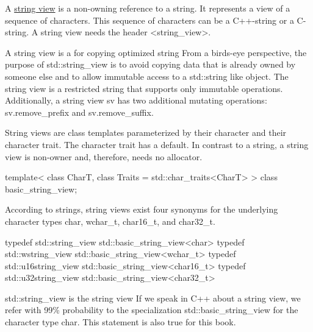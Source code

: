 
A \href{http://en.cppreference.com/w/cpp/string/basic_string_view}{string view} is a non-owning reference to a string. It represents a view of a sequence of characters. This sequence of characters can be a C++-string or a C-string. A string view needs the header <string\_view>.

\begin{myTip}{A string view is a for copying optimized string}
From a birds-eye perspective, the purpose of std::string\_view is to avoid copying data that is already owned by someone else and to allow immutable access to a std::string like object. The string view is a restricted string that supports only immutable operations. Additionally, a string view sv has two additional mutating operations: sv.remove\_prefix and sv.remove\_suffix.
\end{myTip}

String views are class templates parameterized by their character and their character trait. The character trait has a default. In contrast to a string, a string view is non-owner and, therefore, needs no allocator.

\begin{cpp}
template<
	class CharT,
	class Traits = std::char_traits<CharT>
> class basic_string_view;
\end{cpp}

According to strings, string views exist four synonyms for the underlying character types char, wchar\_t, char16\_t, and char32\_t.

\begin{cpp}
typedef std::string_view std::basic_string_view<char>
typedef std::wstring_view std::basic_string_view<wchar_t>
typedef std::u16string_view std::basic_string_view<char16_t>
typedef std::u32string_view std::basic_string_view<char32_t>
\end{cpp}

\begin{myNotic}{std::string\_view is the string view}
If we speak in C++ about a string view, we refer with 99\% probability to the specialization std::basic\_string\_view for the character type char. This statement is also true for this book.
\end{myNotic}




































